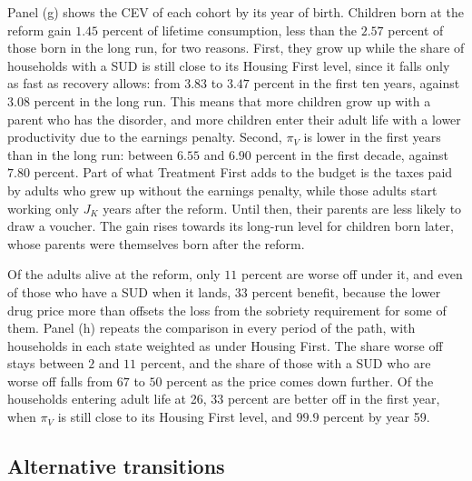 \documentclass[10pt]{article}
\newif\ifshowupdates \showupdatesfalse
\newcommand{\updnum}[1]{\ifshowupdates{\color{blue}#1}\else#1\fi}
\begin{document}
Panel (g) shows the CEV of each cohort by its year of birth. Children born at the reform gain \updnum{$1.45$} percent of lifetime consumption, less than the \updnum{$2.57$} percent of those born in the long run, for two reasons. First, they grow up while the share of households with a SUD is still close to its Housing First level, since it falls only as fast as recovery allows: from \updnum{$3.83$} to \updnum{$3.47$} percent in the first ten years, against \updnum{$3.08$} percent in the long run.  This means that more children grow up with a parent who has the disorder, and more children enter their adult life with a lower productivity due to the earnings penalty. Second, $\pi_V$ is lower in the first years than in the long run: between \updnum{$6.55$} and \updnum{$6.90$} percent in the first decade, against \updnum{$7.80$} percent. Part of what Treatment First adds to the budget is the taxes paid by adults who grew up without the earnings penalty, while those adults start working only $J_K$ years after the reform. Until then, their parents are less likely to draw a voucher. The gain rises towards its long-run level for children born later, whose parents were themselves born after the reform.

Of the adults alive at the reform, only \updnum{$11$} percent are worse off under it, and even of those who have a SUD when it lands, \updnum{$33$} percent benefit, because the lower drug
price more than offsets the loss from the sobriety requirement for some of them. \updnum{Panel (h) repeats the comparison in every period of the path, with households in each state weighted as under Housing First. The share worse off stays between $2$ and $11$ percent, and the share of those with a SUD who are worse off falls from $67$ to $50$ percent as the price comes down further. Of the households entering adult life at 26, $33$ percent are better off in the first year, when $\pi_V$ is still close to its Housing First level, and $99.9$ percent by year 59.}

\subsection{Alternative transitions}\label{sec:alttrans}
\end{document}
